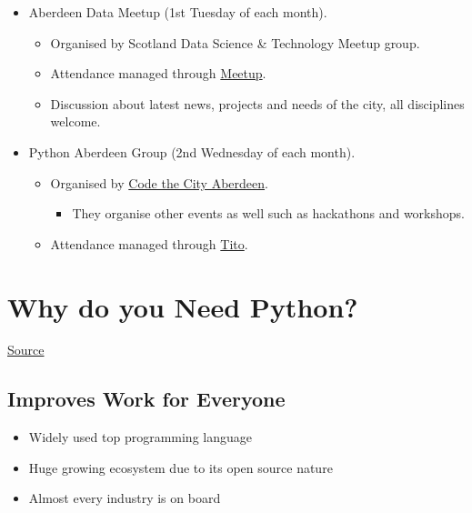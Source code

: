 \documentclass[11pt]{article}
\providecommand{\tightlist}{%
      \setlength{\itemsep}{0pt}\setlength{\parskip}{0pt}}
\begin{document}
\begin{itemize}
\tightlist
\item
  Aberdeen Data Meetup (1st Tuesday of each month).

  \begin{itemize}
  \tightlist
  \item
    Organised by Scotland Data Science \& Technology Meetup group.
  \item
    Attendance managed through
    \href{https://www.meetup.com/Scotland-Data-Science-Technology-Meetup/}{Meetup}.
  \item
    Discussion about latest news, projects and needs of the city, all
    disciplines welcome.
  \end{itemize}
\item
  Python Aberdeen Group (2nd Wednesday of each month).

  \begin{itemize}
  \tightlist
  \item
    Organised by \href{https://codethecity.org/}{Code the City
    Aberdeen}.

    \begin{itemize}
    \tightlist
    \item
      They organise other events as well such as hackathons and
      workshops.
    \end{itemize}
  \item
    Attendance managed through
    \href{https://ti.to/code-the-city/}{Tito}.
  \end{itemize}
\end{itemize}

    \hypertarget{why-do-you-need-python}{%
\section{Why do you Need Python?}\label{why-do-you-need-python}}

\href{https://www.datacamp.com/community/blog/why-your-company-needs-python-for-business-analytics}{Source}

    \hypertarget{improves-work-for-everyone}{%
\subsection{Improves Work for
Everyone}\label{improves-work-for-everyone}}

\begin{itemize}
\tightlist
\item
  Widely used top programming language
\item
  Huge growing ecosystem due to its open source nature
\item
  Almost every industry is on board
\end{itemize}
\end{document}
